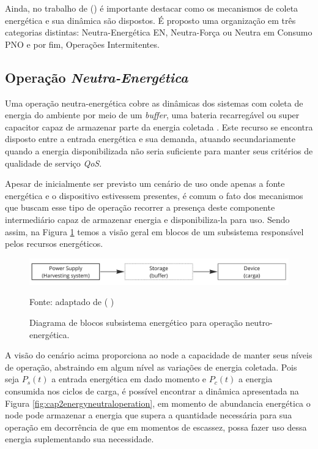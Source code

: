 Ainda, no trabalho de \citeauthor{sliper_energy-driven_2020} (\citeyear{sliper_energy-driven_2020}) é importante destacar como os mecanismos de coleta energética e sua dinâmica são dispostos. É proposto uma organização em três categorias distintas: Neutra-Energética \ac{EN}, Neutra-Força ou Neutra em Consumo \ac{PNO} e por fim, Operações Intermitentes.

\subsection{Operação \textit{Neutra-Energética}}
Uma operação neutra-energética cobre as dinâmicas dos sistemas com coleta de energia do ambiente por meio de um \textit{buffer}, uma bateria recarregável ou super capacitor capaz de armazenar parte da energia coletada \cite{kansal_power_2007}. Este recurso se encontra disposto entre a entrada energética e sua demanda, atuando secundariamente quando a energia disponibilizada não seria suficiente para manter seus critérios de qualidade de serviço \textit{QoS}.

Apesar de inicialmente ser previsto um cenário de uso onde apenas a fonte energética e o dispositivo estivessem presentes, é comum o fato dos mecanismos que buscam esse tipo de operação recorrer a presença deste componente intermediário capaz de armazenar energia e disponibiliza-la para uso. Sendo assim, na Figura \ref{fig:cap2harveststoreuse} temos a visão geral em blocos de um subsistema responsável pelos recursos energéticos.

\begin{figure}[H]
	\centering
	\caption{Diagrama de blocos subsistema energético para operação neutro-energética.}
	\label{fig:cap2harveststoreuse}
	\includegraphics[width=0.7\linewidth]{Imagens/cap2/cap2harvest_store_use}	
	
	Fonte: adaptado de \citeauthor{sudevalayam_energy_2011} (\citeyear{sudevalayam_energy_2011} )
\end{figure}

A visão do cenário acima proporciona ao node a capacidade de manter seus níveis de operação, abstraindo em algum nível as variações de energia coletada. Pois seja $P_{s}(t)$ a entrada energética em dado momento e  $P_{c}(t)$ a energia consumida nos ciclos de carga, é possível encontrar a dinâmica apresentada na Figura \ref{fig:cap2energyneutraloperation}, em momento de abundancia energética o node pode armazenar a energia que supera a quantidade necessária para sua operação em decorrência de que em momentos de escassez, possa fazer uso dessa energia suplementando sua necessidade. 


